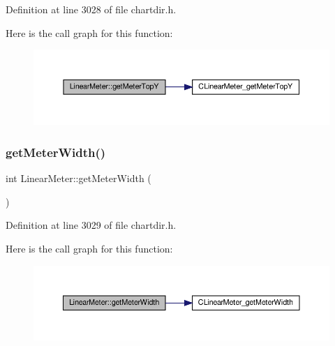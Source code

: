 Definition at line 3028 of file chartdir.\+h.

Here is the call graph for this function\+:
\nopagebreak
\begin{figure}[H]
\begin{center}
\leavevmode
\includegraphics[width=350pt]{class_linear_meter_a9122149ef99dd2abc325af75f8f4e284_cgraph}
\end{center}
\end{figure}
\mbox{\label{class_linear_meter_a52152c56dc40d25788a0538102677f4a}} 
\subsubsection{\texorpdfstring{get\+Meter\+Width()}{getMeterWidth()}}
{\footnotesize\ttfamily int Linear\+Meter\+::get\+Meter\+Width (\begin{DoxyParamCaption}{ }\end{DoxyParamCaption})\hspace{0.3cm}{\ttfamily [inline]}}



Definition at line 3029 of file chartdir.\+h.

Here is the call graph for this function\+:
\nopagebreak
\begin{figure}[H]
\begin{center}
\leavevmode
\includegraphics[width=350pt]{class_linear_meter_a52152c56dc40d25788a0538102677f4a_cgraph}
\end{center}
\end{figure}
\mbox{\label{class_linear_meter_a5c371b61604befc3d3459175740704af}} 

